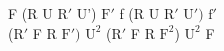 F (R U $\text{R}'$ U') $\text{F}'$ f (R U $\text{R}'$ $\text{U}')$ $\text{f}'$\\
($\text{R}'$ F R $\text{F}')$ $\text{U}^2$ ($\text{R}'$ F R $\text{F}^2$) $\text{U}^2$ F\\
